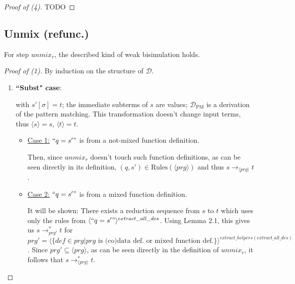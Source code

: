 \documentclass[11pt]{article} %
\begin{document}
\begin{proof}[Proof of (4)]

TODO

\end{proof}

\subsection{Unmix (refunc.)}

For step $unmix_r$, the described kind of weak bisimulation holds.

\begin{proof}[Proof of (1)] By induction on the structure of $\mathcal{D}$.

\begin{enumerate}

\item \textbf{``Subst" case}:

\begin{prooftree}
\end{prooftree}

with $s'[\sigma] = t$; the immediate subterms of $s$ are values; $\mathcal{D}_{\textrm{PM}}$ is a derivation of the pattern matching. This transformation doesn't change input terms, thus $\langle s \rangle = s$, $\langle t \rangle = t$.

\begin{itemize}

\item \underline{Case 1:} $`` q = s' "$ is from a not-mixed function definition.

Then, since $unmix_r$ doesn't touch such function definitions, as can be seen directly in its definition, $(q, s') \in \textrm{Rules}(\langle prg \rangle)$ and thus $s \longrightarrow_{\langle prg \rangle} t$.

\item \underline{Case 2:} $`` q = s' "$ is from a mixed function definition.

It will be shown: There exists a reduction sequence from $s$ to $t$ which uses only the rules from $\langle `` q = s' " \rangle^{extract\_all\_des}$. Using Lemma 2.1, this gives us $s \longrightarrow^*_{prg'} t$ for $prg' = \langle \{ def \in prg | prg \textrm{ is (co)data def. or mixed function def.} \} \rangle^{extract\_helpers(extract\_all\_des)}$. Since $prg' \subseteq \langle prg \rangle$, as can be seen directly in the definition of $unmix_r$, it follows that $s \longrightarrow^*_{\langle prg \rangle} t$.


\end{itemize}
\end{enumerate}
\end{proof}
\end{document}
